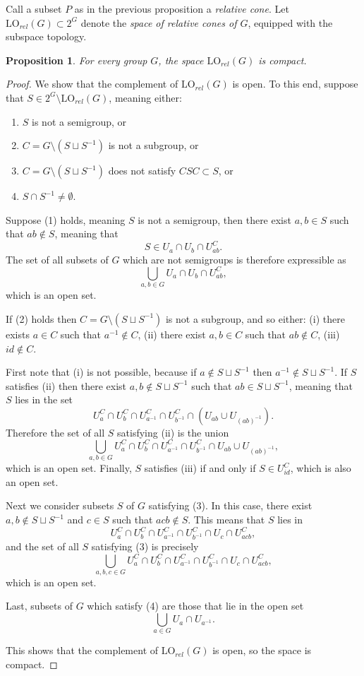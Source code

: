 \documentclass{amsart}
\newtheorem{proposition}[theorem]{Proposition}
\theoremstyle{definition}
\theoremstyle{remark}
\begin{document}
Call a subset $P$ as in the previous proposition a \emph{relative cone}.  Let $\mathrm{LO}_{rel}(G) \subset 2^G$ denote the \emph{space of relative cones of \(G\)}, equipped with the subspace topology. 

\begin{proposition}
\label{prop:compactrel}
    For every group $G$, the space $\mathrm{LO}_{rel}(G)$ is compact.
\end{proposition}
\begin{proof}
We show that the complement of $\mathrm{LO}_{rel}(G)$ is open.  To this end, suppose that $S \in 2^G \setminus \mathrm{LO}_{rel}(G)$, meaning either:

\begin{enumerate}
    \item $S$ is not a semigroup, or
    \item $C = G \setminus (S \sqcup S^{-1})$ is not a subgroup, or
    \item $C = G \setminus (S \sqcup S^{-1})$ does not satisfy $CSC \subset S$, or
        \item $S \cap S^{-1} \neq \emptyset$.
\end{enumerate}
Suppose (1) holds, meaning $S$ is not a semigroup, then there exist $a, b \in S$ such that $ab \notin S$, meaning that 
\[ S \in U_a \cap U_b \cap U_{ab}^C.
\]
The set of all subsets of $G$ which are not semigroups is therefore expressible as
\[ \bigcup_{a, b \in G} U_a \cap U_b \cap U_{ab}^C,
\]
which is an open set. 

If (2) holds then $C = G \setminus (S \sqcup S^{-1})$ is not a subgroup, and so either: (i) there exists $a \in C$ such that $a^{-1} \notin C$, (ii) there exist $a, b \in C$ such that $ab \notin C$, (iii) $id \notin C$.

First note that (i) is not possible, because if $a \notin S \sqcup S^{-1}$ then $a^{-1} \notin S \sqcup S^{-1}$.   If $S$ satisfies (ii) then there exist $a, b \notin S \sqcup S^{-1}$ such that $ab \in S \sqcup S^{-1}$, meaning that $S$ lies in the set 
\[ U_a^C \cap U_b^C \cap U_{a^{-1}}^C \cap U_{b^{-1}}^C \cap (U_{ab} \cup U_{(ab)^{-1}}).
\]
Therefore the set of all $S$ satisfying (ii) is the union
\[ \bigcup_{a, b \in G} U_a^C \cap U_b^C \cap U_{a^{-1}}^C \cap U_{b^{-1}}^C \cap U_{ab} \cup U_{(ab)^{-1}},
\]
which is an open set.  Finally, $S$ satisfies (iii) if and only if $S \in U_{id}^C$, which is also an open set.

Next we consider subsets $S$ of $G$ satisfying (3).  In this case, there exist $a, b \notin S \sqcup S^{-1}$ and $c \in S$ such that $acb \notin S$.  This means that $S$ lies in
\[ U_a^C \cap U_b^C \cap U_{a^{-1}}^C \cap U_{b^{-1}}^C \cap U_c \cap U_{acb}^C, 
\]
and the set of all $S$ satisfying (3) is precisely
\[ \bigcup_{a, b, c \in G} U_a^C \cap U_b^C \cap U_{a^{-1}}^C \cap U_{b^{-1}}^C \cap U_c \cap U_{acb}^C,
\]
which is an open set.

Last, subsets of \(G\) which satisfy (4) are those that lie in the open set
\[ \bigcup_{a \in G} U_a \cap U_{a^{-1}}.
\]

This shows that the complement of $\mathrm{LO}_{rel}(G)$ is open, so the space is compact.
\end{proof}
\end{document}
